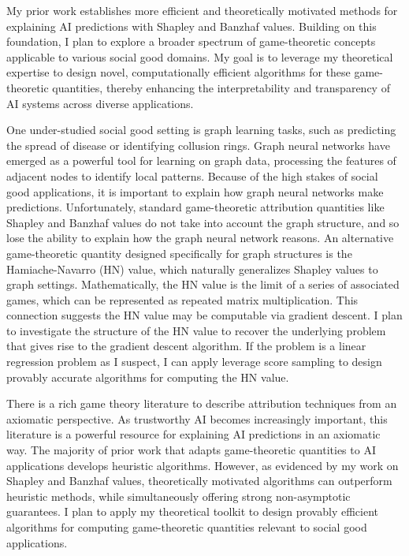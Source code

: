 \documentclass[11pt]{article}
\begin{document}
{My prior work establishes more efficient and theoretically motivated methods for explaining AI predictions with Shapley and Banzhaf values.
Building on this foundation, I plan to explore a broader spectrum of game-theoretic concepts applicable to various social good domains. My goal is to leverage my theoretical expertise to design novel, computationally efficient algorithms for these game-theoretic quantities, thereby enhancing the interpretability and transparency of AI systems across diverse applications.

One under-studied social good setting is graph learning tasks, such as predicting the spread of disease or identifying collusion rings.
Graph neural networks have emerged as a powerful tool for learning on graph data, processing the features of adjacent nodes to identify local patterns.
Because of the high stakes of social good applications, it is important to explain how graph neural networks make predictions.
Unfortunately, standard game-theoretic attribution quantities like Shapley and Banzhaf values do not take into account the graph structure, and so lose the ability to explain how the graph neural network reasons.
An alternative game-theoretic quantity designed specifically for graph structures is the Hamiache-Navarro (HN) value, which naturally generalizes Shapley values to graph settings.
Mathematically, the HN value is the limit of a series of associated games, which can be represented as repeated matrix multiplication.
This connection suggests the HN value may be computable via gradient descent.
I plan to investigate the structure of the HN value to recover the underlying problem that gives rise to the gradient descent algorithm.
If the problem is a linear regression problem as I suspect, I can apply leverage score sampling to design provably accurate algorithms for computing the HN value.

There is a rich game theory literature to describe attribution techniques from an axiomatic perspective.
As trustworthy AI becomes increasingly important, this literature is a powerful resource for explaining AI predictions in an axiomatic way.
The majority of prior work that adapts game-theoretic quantities to AI applications develops heuristic algorithms.
However, as evidenced by my work on Shapley and Banzhaf values, theoretically motivated algorithms can outperform heuristic methods, while simultaneously offering strong non-asymptotic guarantees.
I plan to apply my theoretical toolkit to design provably efficient algorithms for computing game-theoretic quantities relevant to social good applications. 

}
\end{document}

